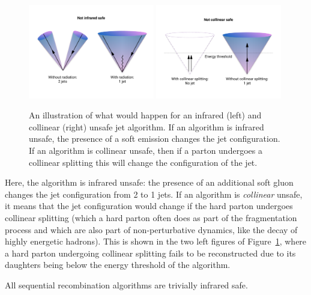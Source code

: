 \begin{figure}[h!] 
    \centering
    \includegraphics[width=0.49\textwidth]{figures/event_reconstruction/IR_safety.pdf}
    \includegraphics[width=0.49\textwidth]{figures/event_reconstruction/Collinear_safety.pdf}
    \caption{An illustration of what would happen for an infrared (left) and collinear (right) unsafe jet algorithm. If an algorithm is infrared unsafe, the presence of a soft emission changes the jet configuration. If an algorithm is collinear unsafe, then if a parton undergoes a collinear splitting this will change the configuration of the jet.}
    \label{fig:objreco:IRC}
\end{figure}

Here, the algorithm is infrared unsafe: the presence of an additional soft gluon changes the jet configuration from 2 to 1 jets. If an algorithm is \textit{collinear} unsafe, it means that the jet configuration would change if the hard parton undergoes collinear splitting (which a hard parton often does as part of the fragmentation process and which are also part of non-perturbative dynamics, like the decay of highly energetic hadrons). This is shown in the two left figures of Figure~\ref{fig:objreco:IRC}, where a hard parton undergoing collinear splitting fails to be reconstructed due to its daughters being below the energy threshold of the algorithm.


All sequential recombination algorithms are trivially infrared safe.
 
